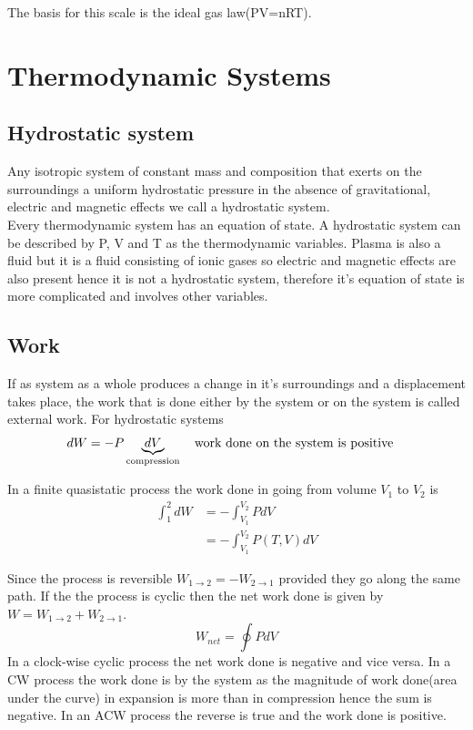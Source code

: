 \documentclass[12pt]{article}
\begin{document}
    The basis for this scale is the ideal gas law(PV=nRT).
    
    \pagebreak
\section{Thermodynamic Systems}
    \subsection{Hydrostatic system}
    Any isotropic system of constant mass and composition that exerts on the surroundings a uniform hydrostatic pressure in the absence of gravitational, electric and magnetic effects we call a hydrostatic system.\\
    
    Every thermodynamic system has an equation of state. A hydrostatic system can be described by P, V and T as the thermodynamic variables. Plasma is also a fluid but it is a fluid consisting of ionic gases so electric and magnetic effects are also present hence it is not a hydrostatic system, therefore it's equation of state is more complicated and involves other variables. 
    
    \subsection{Work}
    If as system as a whole produces a change in it's surroundings and a displacement takes place, the work that is done either by the system or on the system is called external work. For hydrostatic systems
    \begin{equation}
    	dW=-P\underbrace{dV}_\text{compression} \qq{work done on the system is positive} 	
    \end{equation}

    In a finite quasistatic process the work done in going from volume $V_1$ to $V_2$ is
    \begin{align}
    	\int_{1}^{2} dW&=-\int_{V_1}^{V_2} PdV \\
    	       &=-\int_{V_1}^{V_2}P(T,V)dV
    \end{align}
    
    Since the process is reversible $W_{1\to2}=-W_{2\to1}$ provided they go along the same path. If the the process is cyclic then the net work done is given by $W=W_{1\to2}+W_{2\to1}$.
    \begin{equation}
    	W_{net}=\oint PdV 
    \end{equation}
    In a clock-wise cyclic process the net work done is negative and vice versa. In a CW process the work done is by the system as the magnitude of work done(area under the curve) in expansion is more than in compression hence the sum is negative. In an ACW process the reverse is true and the work done is positive.
\end{document}

